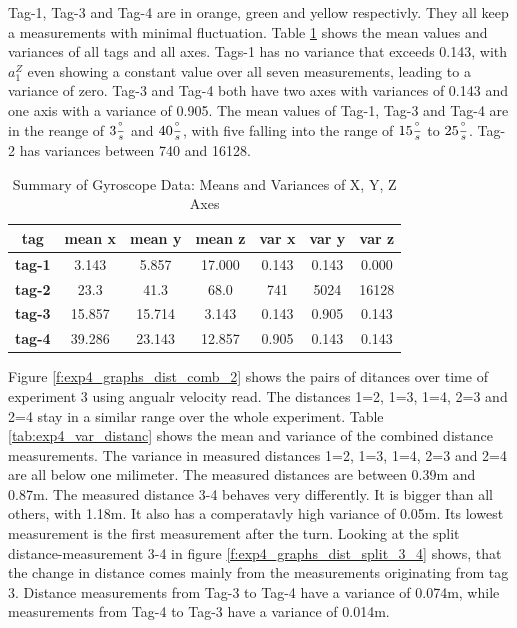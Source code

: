 Tag-1, Tag-3 and Tag-4 are in orange, green and yellow respectivly.
They all keep a measurements with minimal fluctuation.
Table \ref{tab:gyro_mean_2} shows the mean values and variances of all tags and all axes.
Tags-1 has no variance that exceeds 0.143, with $a_1^Z$ even showing a constant value over all seven measurements, leading to a variance of zero.
Tag-3 and Tag-4 both have two axes with variances of 0.143 and one axis with a variance of 0.905.
The mean values of Tag-1, Tag-3 and Tag-4 are in the reange of $3\frac{^\circ}{s}$ and $40\frac{^\circ}{s}$, with five falling into the range of $15\frac{^\circ}{s}$ to $25\frac{^\circ}{s}$.
Tag-2 has variances between 740 and 16128.

\begin{table}[h!]
\centering
\caption{Summary of Gyroscope Data: Means and Variances of X, Y, Z Axes}
\begin{tabular}{c|c c c|c c c|}
\hline
\textbf{tag} & \textbf{mean x} & \textbf{mean y} & \textbf{mean z} & \textbf{var x} & \textbf{var y} & \textbf{var z} \\
\hline
\textbf{tag-1} & 3.143 & 5.857 & 17.000 & 0.143 & 0.143 & 0.000 \\
\textbf{tag-2} & 23.3 & 41.3 & 68.0 & 741 & 5024 & 16128 \\
\textbf{tag-3} & 15.857 & 15.714 & 3.143 & 0.143 & 0.905 & 0.143 \\
\textbf{tag-4} & 39.286 & 23.143 & 12.857 & 0.905 & 0.143 & 0.143 \\
\hline
\end{tabular}
\label{tab:gyro_mean_2}
\end{table}


Figure \ref{f:exp4_graphs_dist_comb_2} shows the pairs of ditances over time of experiment 3 using angualr velocity read.
The distances 1=2, 1=3, 1=4, 2=3 and 2=4 stay in a similar range over the whole experiment.
Table \ref{tab:exp4_var_distanc} shows the mean and variance of the combined distance measurements.
The variance in measured distances 1=2, 1=3, 1=4, 2=3 and 2=4  are all below one milimeter.
The measured distances are between 0.39m and 0.87m.
The measured distance 3-4 behaves very differently.
It is bigger than all others, with 1.18m.
It also has a comperatavly high variance of 0.05m.
Its lowest measurement is the first measurement after the turn.
Looking at the split distance-measurement 3-4 in figure \ref{f:exp4_graphs_dist_split_3_4} shows, that the change in distance comes mainly from the measurements originating from tag 3.
Distance measurements from Tag-3 to Tag-4 have a variance of 0.074m, while measurements from Tag-4 to Tag-3 have a variance of 0.014m.


